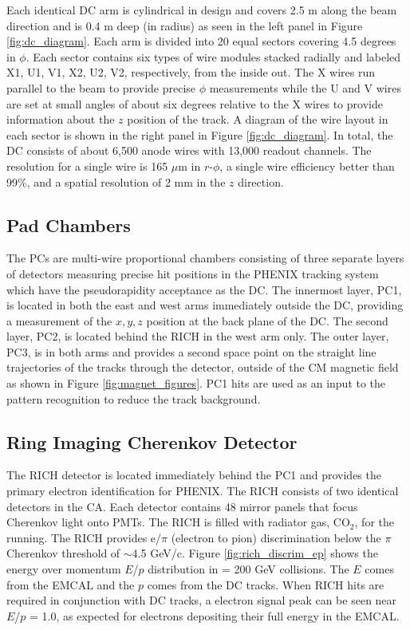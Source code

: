 Each identical DC arm is cylindrical in design and covers 2.5 m along the beam direction and is 0.4 m deep (in radius) as seen in the left panel in Figure \ref{fig:dc_diagram}. Each arm is divided into 20 equal sectors covering 4.5 degrees in $\phi$. Each sector contains six types of wire modules stacked radially and labeled X1, U1, V1, X2, U2, V2, respectively, from the inside out. The X wires run parallel to the beam to provide precise $\phi$ measurements while the U and V wires are set at small angles of about six degrees relative to the X wires to provide information about the $z$ position of the track. A diagram of the wire layout in each sector is shown in the right panel in Figure \ref{fig:dc_diagram}. In total, the DC consists of about 6,500 anode wires with 13,000 readout channels. The  resolution for a single wire is 165 $\mu$m in $r$-$\phi$, a single wire efficiency better than 99\%, and a spatial resolution of  2 mm in the $z$ direction.

\subsection{Pad Chambers}
The PCs are multi-wire proportional chambers consisting of three separate layers of detectors measuring precise hit positions in the PHENIX tracking system which have the pseudorapidity acceptance as the DC. The innermost layer, PC1, is located in both the east and west arms immediately outside the DC, providing a measurement of the $x, y, z$ position at the back plane of the DC. The second layer, PC2, is located behind the RICH in the west arm only. The outer layer, PC3, is in both arms and provides a second space point on the straight line trajectories of the tracks through the detector, outside of the CM magnetic field as shown in Figure \ref{fig:magnet_figures}. PC1 hits are used as an input to the pattern recognition to reduce the track background.

\subsection{Ring Imaging Cherenkov Detector}
The RICH detector is located immediately behind the PC1 and provides the primary electron identification for PHENIX. The RICH consists of two identical detectors in the CA. Each detector contains 48 mirror panels that focus Cherenkov light onto PMTs. The RICH is filled with radiator gas, CO$_2$, for the \pau running. The RICH provides e/$\pi$ (electron to pion) discrimination below the $\pi$ Cherenkov threshold of $\sim$4.5 GeV/c. Figure \ref{fig:rich_discrim_ep} shows the energy over momentum $E$/$p$ distribution in \auau \sqsn = 200 GeV collisions. The $E$ comes from the EMCAL and the $p$ comes from the DC tracks. When RICH hits are required in conjunction with DC tracks, a electron signal peak can be seen near $E$/$p$ = 1.0, as expected for electrons depositing their full energy in the EMCAL.

